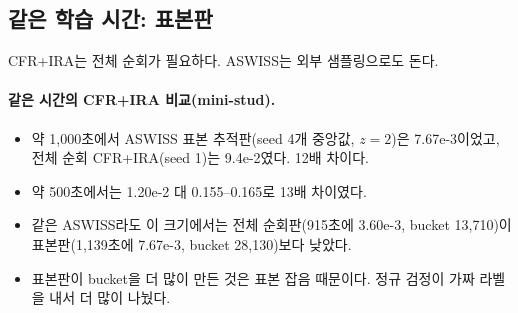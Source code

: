 \subsection{같은 학습 시간: 표본판}\label{sec:exp-time}
CFR+IRA는 전체 순회가 필요하다. ASWISS는 외부 샘플링으로도 돈다.
\paragraph{같은 시간의 CFR+IRA 비교(mini-stud).}
\begin{itemize}
  \item 약 1,000초에서 ASWISS 표본 추적판(seed 4개 중앙값, $z=2$)은 7.67e-3이었고, 전체 순회 CFR+IRA(seed 1)는 9.4e-2였다. 12배 차이다.
  \item 약 500초에서는 1.20e-2 대 0.155–0.165로 13배 차이였다.
  \item 같은 ASWISS라도 이 크기에서는 전체 순회판(915초에 3.60e-3, bucket 13,710)이 표본판(1,139초에 7.67e-3, bucket 28,130)보다 낮았다.
  \item 표본판이 bucket을 더 많이 만든 것은 표본 잡음 때문이다. 정규 검정이 가짜 라벨을 내서 더 많이 나눴다.
\end{itemize}


